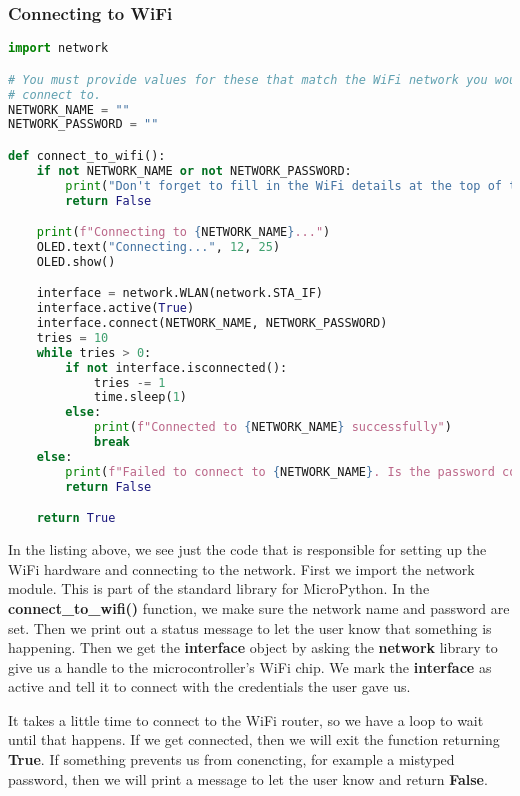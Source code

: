 \subsubsection{Connecting to WiFi}
\begin{lstlisting}[language=Python,caption=WiFi Code]
import network

# You must provide values for these that match the WiFi network you would like to
# connect to.
NETWORK_NAME = ""
NETWORK_PASSWORD = ""

def connect_to_wifi():
    if not NETWORK_NAME or not NETWORK_PASSWORD:
        print("Don't forget to fill in the WiFi details at the top of the script!")
        return False

    print(f"Connecting to {NETWORK_NAME}...")
    OLED.text("Connecting...", 12, 25)
    OLED.show()

    interface = network.WLAN(network.STA_IF)
    interface.active(True)
    interface.connect(NETWORK_NAME, NETWORK_PASSWORD)
    tries = 10
    while tries > 0:
        if not interface.isconnected():
            tries -= 1
            time.sleep(1)
        else:
            print(f"Connected to {NETWORK_NAME} successfully")
            break
    else:
        print(f"Failed to connect to {NETWORK_NAME}. Is the password correct?")
        return False

    return True
\end{lstlisting}

In the listing above, we see just the code that is responsible for setting up the WiFi hardware and connecting
to the network. First we import the network module. This is part of the standard library for MicroPython.
In the \textbf{connect\_to\_wifi()} function, we make sure the network name and password are set. Then
we print out a status message to let the user know that something is happening. Then we get the \textbf{interface}
object by asking the \textbf{network} library to give us a handle to the microcontroller's WiFi chip. We mark
the \textbf{interface} as active and tell it to connect with the credentials the user gave us.

It takes a little time to connect to the WiFi router, so we have a loop to wait until that happens. If we
get connected, then we will exit the function returning \textbf{True}. If something prevents us from conencting,
for example a mistyped password, then we will print a message to let the user know and return \textbf{False}.

